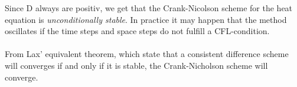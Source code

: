 Since D always are positiv, we get that the Crank-Nicolson
scheme for the heat equation is \emph{unconditionally stable}. In practice it may happen that the method oscillates if the time steps and space steps do not fulfill a CFL-condition.
\\
\\
From Lax' equivalent theorem, which state that a consistent difference scheme will converges if and only if it is stable, the Crank-Nicholson scheme will converge.



